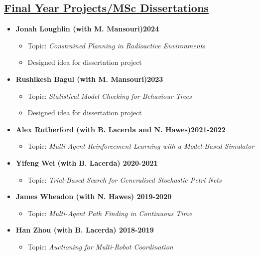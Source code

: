\documentclass[11pt]{article}
\begin{document}
\subsection*{\underline{Final Year Projects/MSc Dissertations}}
\begin{itemize}
\item \textbf{Jonah Loughlin (with M. Mansouri)\hfill 2024}
\begin{itemize}
\item Topic: \emph{Constrained Planning in Radioactive Environments}
\item Designed idea for dissertation project
\end{itemize}
\item \textbf{Rushikesh Bagul (with M. Mansouri)\hfill 2023}
\begin{itemize}
\item Topic: \emph{Statistical Model Checking for Behaviour Trees}
\item Designed idea for dissertation project
\end{itemize}
\item \textbf{Alex Rutherford (with B. Lacerda and N. Hawes)\hfill 2021-2022}
\begin{itemize}
\item Topic: \emph{Multi-Agent Reinforcement Learning with a Model-Based Simulator}
\end{itemize}
\item \textbf{Yifeng Wei (with B. Lacerda) \hfill 2020-2021}
\begin{itemize}
\item Topic: \emph{Trial-Based Search for Generalised Stochastic Petri Nets}
\end{itemize} 
\item \textbf{James Wheadon (with N. Hawes) \hfill 2019-2020}
\begin{itemize}
\item  Topic: \emph{Multi-Agent Path Finding in Continuous Time}
\end{itemize}
\item \textbf{Han Zhou (with B. Lacerda) \hfill 2018-2019}
\begin{itemize}
\item Topic: \emph{Auctioning for Multi-Robot Coordination}
\end{itemize}
\end{itemize}
\end{document}
